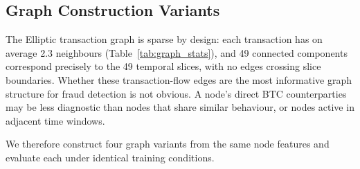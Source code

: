 


\subsection{Graph Construction Variants}
\label{sec:graph_construction}

The Elliptic transaction graph is sparse by design: each transaction has
on average 2.3 neighbours (Table~\ref{tab:graph_stats}), and 49 connected
components correspond precisely to the 49 temporal slices, with no edges
crossing slice boundaries. Whether these transaction-flow edges are the most
informative graph structure for fraud detection is not obvious. A node's
direct BTC counterparties may be less diagnostic than nodes that share
similar behaviour, or nodes active in adjacent time windows.

We therefore construct four graph variants from the same node features and
evaluate each under identical training conditions.

